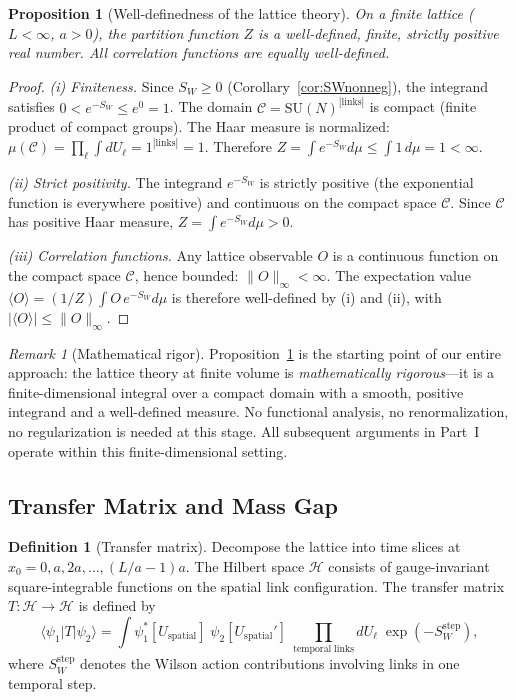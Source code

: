 \documentclass[12pt,a4paper]{article}
\theoremstyle{plain}
\newtheorem{proposition}[theorem]{Proposition}
\theoremstyle{definition}
\newtheorem{definition}[theorem]{Definition}
\theoremstyle{remark}
\newtheorem{remark}[theorem]{Remark}
\begin{document}
\begin{proposition}[Well-definedness of the lattice theory]\label{prop:wd}
On a finite lattice ($L<\infty$, $a>0$), the partition function $Z$ is a well-defined, finite, strictly positive real number. All correlation functions are equally well-defined.
\end{proposition}

\begin{proof}
\textit{(i) Finiteness.} Since $S_W\geq 0$ (Corollary~\ref{cor:SWnonneg}), the integrand satisfies $0<e^{-S_W}\leq e^0=1$. The domain $\mathcal{C}=\mathrm{SU}(N)^{|\mathrm{links}|}$ is compact (finite product of compact groups). The Haar measure is normalized: $\mu(\mathcal{C})=\prod_\ell\int dU_\ell=1^{|\mathrm{links}|}=1$. Therefore $Z=\int e^{-S_W}d\mu\leq\int 1\,d\mu=1<\infty$.

\textit{(ii) Strict positivity.} The integrand $e^{-S_W}$ is strictly positive (the exponential function is everywhere positive) and continuous on the compact space $\mathcal{C}$. Since $\mathcal{C}$ has positive Haar measure, $Z=\int e^{-S_W}d\mu>0$.

\textit{(iii) Correlation functions.} Any lattice observable $O$ is a continuous function on the compact space $\mathcal{C}$, hence bounded: $\|O\|_\infty<\infty$. The expectation value $\langle O\rangle=(1/Z)\int O\,e^{-S_W}d\mu$ is therefore well-defined by (i) and (ii), with $|\langle O\rangle|\leq\|O\|_\infty$.
\end{proof}

\begin{remark}[Mathematical rigor]
Proposition~\ref{prop:wd} is the starting point of our entire approach: the lattice theory at finite volume is \emph{mathematically rigorous}---it is a finite-dimensional integral over a compact domain with a smooth, positive integrand and a well-defined measure. No functional analysis, no renormalization, no regularization is needed at this stage. All subsequent arguments in Part~I operate within this finite-dimensional setting.
\end{remark}

\subsection{Transfer Matrix and Mass Gap}\label{sec:transfer}

\begin{definition}[Transfer matrix]\label{def:transfer}
Decompose the lattice into time slices at $x_0=0,a,2a,\ldots,(L/a-1)a$. The Hilbert space $\mathcal{H}$ consists of gauge-invariant square-integrable functions on the spatial link configuration. The transfer matrix $T:\mathcal{H}\to\mathcal{H}$ is defined by
\begin{equation}
\langle\psi_1|T|\psi_2\rangle = \int \psi_1^*[U_{\mathrm{spatial}}]\;\psi_2[U_{\mathrm{spatial}}']\;\prod_{\mathrm{temporal\;links}}dU_\ell\;\exp(-S_W^{\mathrm{step}}),
\end{equation}
where $S_W^{\mathrm{step}}$ denotes the Wilson action contributions involving links in one temporal step.
\end{definition}
\end{document}
